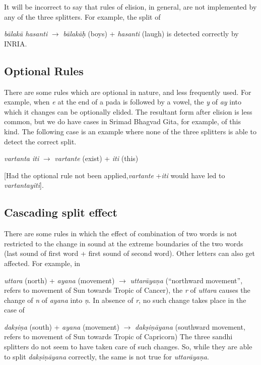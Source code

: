 \documentclass[11pt]{article}
\begin{document}
It will be incorrect to say that rules of elision, in general, are not implemented by any of the three splitters. For example, the split of
 
            \textit{b\={a}lak\={a} hasanti} $\rightarrow$ \textit{b\={a}lak\={a}\d{h}} (boys) + \textit{hasanti} (laugh) is detected correctly by INRIA.                      

    
\subsection{Optional Rules}    
There are some rules which are optional in nature, and less frequently used. For example, when \textit{e} at the end of a pada is followed by a vowel, the \textit{y} of \textit{ay} into which it changes can be optionally elided. The resultant form after elision is less common, but we do have cases in Srimad Bhagvad Gita, for example, of this kind. The following case is an example where none of the three splitters is able to detect the correct split.
    
   \textit{ vartanta iti} $\rightarrow$ \textit{vartante} (exist) + \textit{iti} (this)
   
[Had the optional rule not been applied,\textit{vartante} +\textit{iti} would have led to \textit{vartantayiti}]. 

\subsection{Cascading split effect}
There are some rules in which the effect of combination of two words is not restricted to the change in sound at the extreme boundaries of the two words (last sound of first word + first sound of second word). Other letters can also get affected. For example, in 

       \textit{uttara} (north) + \textit{ayana} (movement) $\rightarrow$ \textit{uttar\={a}ya\d{n}a} (``northward movement'', refers to movement of Sun towards Tropic of Cancer), the \textit{r} of \textit{uttara} causes the change of \textit{n} of \textit{ayana} into \textit{ \d{n}}. In absence of \textit{r}, no such change takes place in the case of 


\textit{dak\d{s}i\d{n}a} (south) + \textit{ayana} (movement) $\rightarrow$ \textit{dak\d{s}i\d{n}\={a}yana} (southward movement, refers to movement of Sun towards Tropic of Capricorn) 
The three sandhi splitters do not seem to have taken care of such changes. So, while they are able to split \textit{dak\d{s}i\d{n}\={a}yana} correctly, the same is not true for \textit{uttar\={a}ya\d{n}a}.
\end{document}
